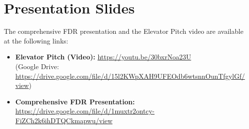 \documentclass[10pt,a4paper]{article}
\begin{document}

\section{Presentation Slides}
\label{app:presentation-slides}

The comprehensive FDR presentation and the Elevator Pitch video are available
at the following links:

\begin{itemize}
    \item \textbf{Elevator Pitch (Video):}
          \url{https://youtu.be/30bxrNoa23U} \\
          (Google Drive: \url{https://drive.google.com/file/d/15l2KWpXAH9UFEOdb6wtsnnOunTfgylGf/view})
    \item \textbf{Comprehensive FDR Presentation:}
          \url{https://drive.google.com/file/d/1muxtr2ontcy-FiZCh2k6ihDTQCkmapwu/view}
\end{itemize}

\label{sec:references}
{\small
\raggedright

}
\end{document}
